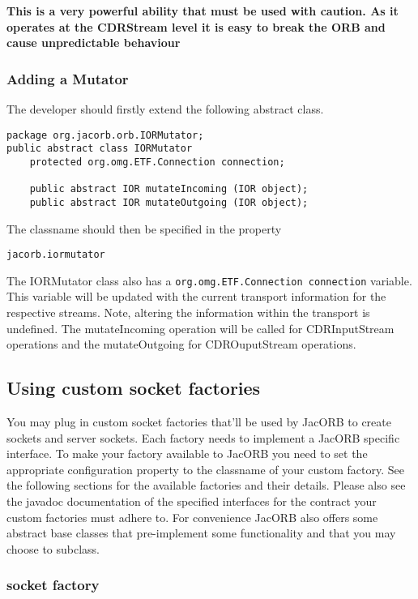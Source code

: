 {{\textbf{This is a very powerful ability that must be used with caution. As it operates
at the CDRStream level it is easy to break the ORB and cause unpredictable behaviour}

\subsubsection{Adding a Mutator}
The developer should firstly extend the following abstract class.
\begin{small}
\begin{verbatim}
package org.jacorb.orb.IORMutator;
public abstract class IORMutator
    protected org.omg.ETF.Connection connection;

    public abstract IOR mutateIncoming (IOR object);
    public abstract IOR mutateOutgoing (IOR object);
\end{verbatim}
\end{small}
The classname should then be specified in the property
\begin{verbatim}
jacorb.iormutator
\end{verbatim}

The IORMutator class also has a {\tt org.omg.ETF.Connection connection} variable. This
variable will be updated with the current transport information for the respective
streams. Note, altering the information within the transport is undefined. The
mutateIncoming operation will be called for CDRInputStream operations and the
mutateOutgoing for CDROuputStream operations.

\subsection{Using custom socket factories}
\label{sec:customSocketFactories}

You may plug in custom socket factories that'll be used by JacORB to
create sockets and server sockets. Each factory needs to implement a JacORB specific
interface. To make your factory available to JacORB you need to set the appropriate
configuration property to the classname of your custom factory. See the following
sections for the available factories and their details. Please also see the javadoc documentation
of the specified interfaces for the contract your custom factories must adhere to.
For convenience JacORB also offers some abstract base classes that pre-implement some functionality and that you
may choose to subclass.

\subsubsection{socket factory}

}}
